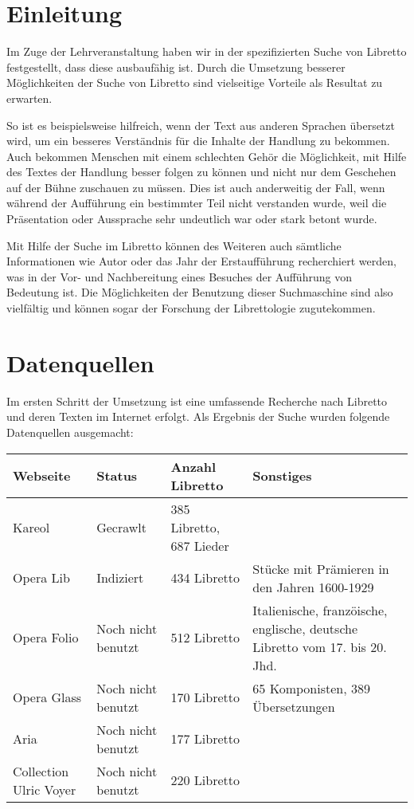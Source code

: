 \section{Einleitung}
Im Zuge der Lehrveranstaltung  
haben wir in der spezifizierten Suche von Libretto festgestellt,
dass diese ausbaufähig ist.
Durch die Umsetzung besserer Möglichkeiten der Suche von Libretto 
sind vielseitige Vorteile als Resultat zu erwarten. 

So ist es beispielsweise hilfreich, 
wenn der Text aus anderen Sprachen übersetzt wird, 
um ein besseres Verständnis für die Inhalte der Handlung zu bekommen. 
Auch bekommen Menschen mit einem schlechten Gehör die Möglichkeit, 
mit Hilfe des Textes der Handlung besser folgen zu können 
und nicht nur dem Geschehen auf der Bühne zuschauen zu müssen. 
Dies ist auch anderweitig der Fall, 
wenn während der Aufführung ein bestimmter Teil nicht verstanden wurde, 
weil die Präsentation oder Aussprache sehr undeutlich war 
oder stark betont wurde. 

Mit Hilfe der Suche im Libretto können des Weiteren 
auch sämtliche Informationen wie Autor oder das Jahr der Erstaufführung 
recherchiert werden, 
was in der Vor- und Nachbereitung eines Besuches der Aufführung 
von Bedeutung ist. 
Die Möglichkeiten der Benutzung dieser Suchmaschine sind also vielfältig 
und können sogar der Forschung der Librettologie zugutekommen.

\section{Datenquellen}
Im ersten Schritt der Umsetzung ist eine umfassende Recherche 
nach Libretto und deren Texten im Internet erfolgt. 
Als Ergebnis der Suche wurden folgende Datenquellen ausgemacht:

\begin{tabular}{l l l l}
    \toprule
    Webseite & Status & Anzahl Libretto & Sonstiges \\
    \midrule
    Kareol & Gecrawlt & 385 Libretto, 687 Lieder & \\
    Opera Lib & Indiziert & 434 Libretto & Stücke mit Prämieren in den Jahren 1600-1929 \\
    Opera Folio & Noch nicht benutzt & 512 Libretto & Italienische, franzöische, englische, deutsche Libretto vom 17. bis 20. Jhd. \\
    Opera Glass & Noch nicht benutzt & 170 Libretto & 65 Komponisten, 389 Übersetzungen \\
    Aria & Noch nicht benutzt & 177 Libretto & \\
    Collection Ulric Voyer & Noch nicht benutzt & 220 Libretto & \\
    \bottomrule
\end{tabular}

